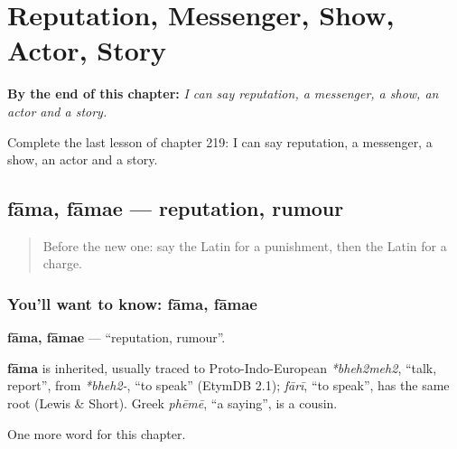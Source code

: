 
\chapter{Reputation, Messenger, Show, Actor, Story}
\label{ch:la-reputation-messenger-show-actor-story}

\begin{chapteropening}
\textbf{By the end of this chapter:} \emph{I can say reputation, a messenger, a show, an actor and a story.}

Complete the last lesson of chapter 219: I can say reputation, a messenger, a show, an actor and a story.
\end{chapteropening}

\section[fāma, fāmae]{fāma, fāmae — reputation, rumour}

\label{lesson:LA-C219-fama}



\begin{quote}
Before the new one: say the Latin for a punishment, then the Latin for a charge.
\end{quote}

\subsection*{You'll want to know: fāma, fāmae}
\textbf{fāma, fāmae} — \textquotedblleft{}reputation, rumour\textquotedblright{}.

\begin{cousinweb}
\textbf{fāma} is inherited, usually traced to Proto-Indo-European \emph{*bheh2meh2}, \textquotedblleft{}talk, report\textquotedblright{}, from \emph{*bheh2-}, \textquotedblleft{}to speak\textquotedblright{} (EtymDB 2.1); \emph{fārī}, \textquotedblleft{}to speak\textquotedblright{}, has the same root (Lewis \& Short). Greek \emph{phēmē}, \textquotedblleft{}a saying\textquotedblright{}, is a cousin.
\end{cousinweb}

\begin{grammarlens}[title={What you've built}]
One more word for this chapter.
\end{grammarlens}


